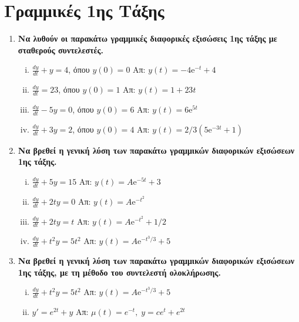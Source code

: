 \documentclass[a4paper,table]{report}
\begin{document}
\begin{center}
  \minibox{\large \bfseries \textcolor{Col1}{Ασκήσεις Διαφορικές Εξισώσεις}}
\end{center}

\vspace{\baselineskip}

\section*{Γραμμικές 1ης Τάξης}

\begin{enumerate}
  \item {\bfseries Να λυθούν οι παρακάτω γραμμικές διαφορικές εξισώσεις 1ης τάξης 
    με σταθερούς συντελεστές.}
    \begin{enumerate}[i)]
      \item  $\frac{dy}{dt} + y = 4$, όπου $y(0) = 0$ 
        \hfill Απ: $ y(t)=-4 \mathrm{e}^{-t} + 4$
      \item  $\frac{dy}{dt} = 23$, όπου $y(0) = 1$ 
        \hfill Απ: $ y(t)=1+23t $ 
      \item  $\frac{dy}{dt} -5 y = 0$, όπου $y(0) = 6$ 
        \hfill Απ: $ y(t)=6 \mathrm{e}^{5t} $ 
      \item  $\frac{dy}{dt} +3 y = 2$, όπου $y(0) = 4$ 
        \hfill Απ: $ y(t)=2/3(5\mathrm{e}^{-3t} +1) $ 
    \end{enumerate}

  \item {\bfseries Να βρεθεί η γενική λύση των παρακάτω γραμμικών διαφορικών εξισώσεων 
    1ης τάξης.}
    \begin{enumerate}[i)]
      \item  $\frac{dy}{dt} + 5y = 15$ \hfill Απ: $ y(t)=A \mathrm{e}^{-5t} +3 $ 
      \item  $\frac{dy}{dt} + 2ty = 0$ \hfill Απ: $ y(t)=A \mathrm{e}^{-t^{2}} $ 
      \item  $\frac{dy}{dt} + 2ty = t$ \hfill Απ: $ y(t)=A \mathrm{e}^{-t^{2}} +1/2 $ 
      \item  $\frac{dy}{dt} + t^{2}y = 5t^{2}$ 
        \hfill Απ: $ y(t)=A \mathrm{e}^{-t^{3}/3} +5 $ 
    \end{enumerate}

  \item {\bfseries Να βρεθεί η γενική λύση των παρακάτω γραμμικών διαφορικών εξισώσεων 
      1ης τάξης, με τη μέθοδο του συντελεστή ολοκλήρωσης.}
      \begin{enumerate}[i)]
        \item  $\frac{dy}{dt} + t^{2}y = 5t^{2}$ 
          \hfill Απ: $ y(t)=A \mathrm{e}^{-t^{3}/3} +5 $ 
        \item $ y' = e^{2t}+y $ \hfill Απ: $ \mu (t) = e^{-t}, \; y=ce^{t}+e^{2t} $ 
      \end{enumerate}
\end{enumerate}
\end{document}
